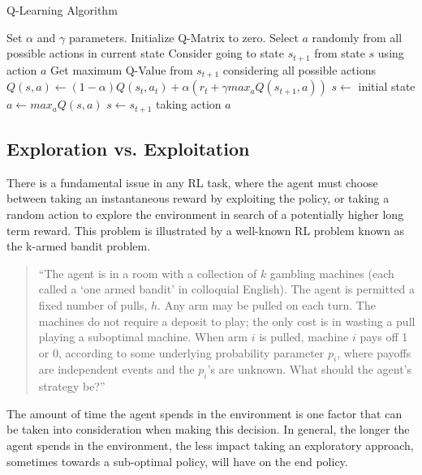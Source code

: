\begin{algorithm}
    \caption{Q-Learning Algorithm}\label{alg:QL}
    \begin{algorithmic}[1]
        \State Set $\alpha$ and $\gamma$ parameters.
        \State Initialize Q-Matrix to zero.
        \Repeat
        \State Select $a$ randomly from all possible actions in current state
        \State Consider going to state $s_{t+1}$ from state $s$ using action $a$
        \State Get maximum Q-Value from $s_{t+1}$ considering all possible actions
        \State $Q(s, a) \gets (1-\alpha)Q(s_t, a_t) + \alpha(r_t + \gamma max_aQ(s_{t+1}, a))$
        \EndWhile
        \EndProcedure
        \State $s \gets$ initial state
        \State $a \gets max_{a}Q(s, a)$
        \State $s \gets s_{t+1}$ taking action $a$
        \EndWhile
        \EndProcedure
    \end{algorithmic}
\end{algorithm}

\subsection{Exploration vs. Exploitation}
There is a fundamental issue in any RL task, where the agent must choose between taking an
instantaneous reward by exploiting the policy, or taking a random action to explore the environment
in search of a potentially higher long term reward. This problem is illustrated by a well-known RL
problem known as the k-armed bandit problem.

\begin{quotation}
    ``The agent is in a room with a collection of $k$ gambling machines (each called a `one armed
    bandit' in colloquial English). The agent is permitted a fixed number of pulls, $h$. Any arm may
    be pulled on each turn. The machines do not require a deposit to play; the only cost is in
    wasting a pull playing a suboptimal machine. When arm $i$ is pulled, machine $i$ pays off 1 or
    0, according to some underlying probability parameter $p_i$, where payoffs are independent
    events and the $p_i$'s are unknown. What should the agent's strategy be?''
    \cite{kaelbling1996reinforcement}
\end{quotation}

The amount of time the agent spends in the environment is one factor that can be taken into
consideration when making this decision. In general, the longer the agent spends in the environment,
the less impact taking an exploratory approach, sometimes towards a sub-optimal policy, will have on
the end policy. \paragraph{}

